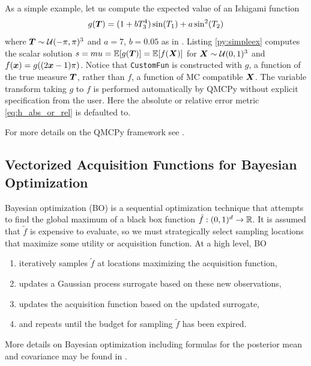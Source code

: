 \documentclass{article}[12pt]
\begin{document}
As a simple example, let us compute the expected value of an Ishigami function \cite{ishigami1990importance}
\begin{equation}
    g(\boldsymbol{T}) = (1+bT_3^4)\sin(T_1)+a\sin^2(T_2)
    \label{eq:ishigami}
\end{equation}
where $\boldsymbol{T} \sim \mathcal{U}(-\pi,\pi)^3$ and $a=7$, $b=0.05$ as in \cite{sobol1999use}. Listing \ref{py:simpleex} computes the scalar solution $s = mu = \mathbb{E}[g(\boldsymbol{T})]=\mathbb{E}[f(\boldsymbol{X})]$ for $\boldsymbol{X} \sim \mathcal{U}(0,1)^3$ and $f(\boldsymbol{x}) = g((2\boldsymbol{x}-1)\pi)$. Notice that \texttt{CustomFun} is constructed with $g$, a function of the true measure $\boldsymbol{T}$, rather than $f$, a function of MC compatible $\boldsymbol{X}$. The variable transform taking $g$ to $f$ is performed automatically by QMCPy without explicit specification from the user. Here the absolute or relative error metric \eqref{eq:h_abs_or_rel} is defaulted to. 

For more details on the QMCPy framework see \cite{QMCSoftware}.

\subsection{Vectorized Acquisition Functions for Bayesian Optimization}

Bayesian optimization (BO) is a sequential optimization technique that attempts to find the global maximum of a black box function $\tilde{f}: (0,1)^{d} \to \mathbb{R}$. It is assumed that $\tilde{f}$ is expensive to evaluate, so we must strategically select sampling locations that maximize some utility or acquisition function. At a high level, BO 
\begin{enumerate}
    \item iteratively samples $\tilde{f}$ at locations maximizing the acquisition function,
    \item updates a Gaussian process surrogate based on these new observations,
    \item updates the acquisition function based on the updated surrogate,
    \item and repeats until the budget for sampling $\tilde{f}$ has been expired.
\end{enumerate}
More details on Bayesian optimization including formulas for the posterior mean and covariance may be found in \cite{frazier2018tutorial}.
\end{document}
